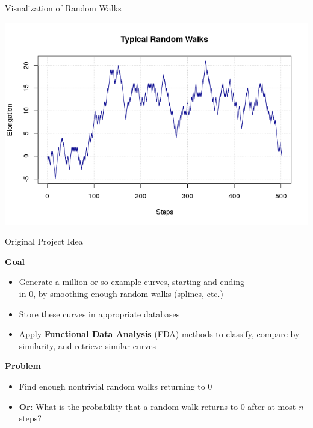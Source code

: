 \documentclass[ignorenonframetext,]{beamer}
\providecommand{\tightlist}{%
  \setlength{\itemsep}{0pt}\setlength{\parskip}{0pt}}
\begin{document}
\begin{frame}{Visualization of Random Walks}
\protect\hypertarget{visualization-of-random-walks}{}

\includegraphics{TypRandomWalks.png}

\end{frame}

\begin{frame}{Original Project Idea}
\protect\hypertarget{original-project-idea}{}

\textbf{Goal}

\begin{itemize}
\tightlist
\item
  Generate a million or so example curves, starting and ending\\
  in 0, by smoothing enough random walks (splines, etc.)
\item
  Store these curves in appropriate databases
\item
  Apply \textbf{Functional Data Analysis} (FDA) methods to classify,
  compare by similarity, and retrieve similar curves
\end{itemize}

\textbf{Problem}

\begin{itemize}
\item
  Find enough nontrivial random walks returning to 0
\item
  \textbf{Or}: What is the probability that a random walk returns to 0
  after at most \emph{n} steps?
\end{itemize}

\end{frame}
\end{document}
